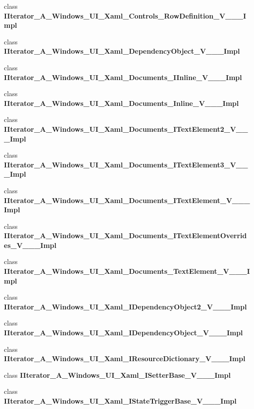 \begin{DoxyCompactItemize}
\item 
class {\bfseries I\+Iterator\+\_\+\+A\+\_\+\+Windows\+\_\+\+U\+I\+\_\+\+Xaml\+\_\+\+Controls\+\_\+\+Row\+Definition\+\_\+\+V\+\_\+\+\_\+\+\_\+\+Impl}
\item 
class {\bfseries I\+Iterator\+\_\+\+A\+\_\+\+Windows\+\_\+\+U\+I\+\_\+\+Xaml\+\_\+\+Dependency\+Object\+\_\+\+V\+\_\+\+\_\+\+\_\+\+Impl}
\item 
class {\bfseries I\+Iterator\+\_\+\+A\+\_\+\+Windows\+\_\+\+U\+I\+\_\+\+Xaml\+\_\+\+Documents\+\_\+\+I\+Inline\+\_\+\+V\+\_\+\+\_\+\+\_\+\+Impl}
\item 
class {\bfseries I\+Iterator\+\_\+\+A\+\_\+\+Windows\+\_\+\+U\+I\+\_\+\+Xaml\+\_\+\+Documents\+\_\+\+Inline\+\_\+\+V\+\_\+\+\_\+\+\_\+\+Impl}
\item 
class {\bfseries I\+Iterator\+\_\+\+A\+\_\+\+Windows\+\_\+\+U\+I\+\_\+\+Xaml\+\_\+\+Documents\+\_\+\+I\+Text\+Element2\+\_\+\+V\+\_\+\+\_\+\+\_\+\+Impl}
\item 
class {\bfseries I\+Iterator\+\_\+\+A\+\_\+\+Windows\+\_\+\+U\+I\+\_\+\+Xaml\+\_\+\+Documents\+\_\+\+I\+Text\+Element3\+\_\+\+V\+\_\+\+\_\+\+\_\+\+Impl}
\item 
class {\bfseries I\+Iterator\+\_\+\+A\+\_\+\+Windows\+\_\+\+U\+I\+\_\+\+Xaml\+\_\+\+Documents\+\_\+\+I\+Text\+Element\+\_\+\+V\+\_\+\+\_\+\+\_\+\+Impl}
\item 
class {\bfseries I\+Iterator\+\_\+\+A\+\_\+\+Windows\+\_\+\+U\+I\+\_\+\+Xaml\+\_\+\+Documents\+\_\+\+I\+Text\+Element\+Overrides\+\_\+\+V\+\_\+\+\_\+\+\_\+\+Impl}
\item 
class {\bfseries I\+Iterator\+\_\+\+A\+\_\+\+Windows\+\_\+\+U\+I\+\_\+\+Xaml\+\_\+\+Documents\+\_\+\+Text\+Element\+\_\+\+V\+\_\+\+\_\+\+\_\+\+Impl}
\item 
class {\bfseries I\+Iterator\+\_\+\+A\+\_\+\+Windows\+\_\+\+U\+I\+\_\+\+Xaml\+\_\+\+I\+Dependency\+Object2\+\_\+\+V\+\_\+\+\_\+\+\_\+\+Impl}
\item 
class {\bfseries I\+Iterator\+\_\+\+A\+\_\+\+Windows\+\_\+\+U\+I\+\_\+\+Xaml\+\_\+\+I\+Dependency\+Object\+\_\+\+V\+\_\+\+\_\+\+\_\+\+Impl}
\item 
class {\bfseries I\+Iterator\+\_\+\+A\+\_\+\+Windows\+\_\+\+U\+I\+\_\+\+Xaml\+\_\+\+I\+Resource\+Dictionary\+\_\+\+V\+\_\+\+\_\+\+\_\+\+Impl}
\item 
class {\bfseries I\+Iterator\+\_\+\+A\+\_\+\+Windows\+\_\+\+U\+I\+\_\+\+Xaml\+\_\+\+I\+Setter\+Base\+\_\+\+V\+\_\+\+\_\+\+\_\+\+Impl}
\item 
class {\bfseries I\+Iterator\+\_\+\+A\+\_\+\+Windows\+\_\+\+U\+I\+\_\+\+Xaml\+\_\+\+I\+State\+Trigger\+Base\+\_\+\+V\+\_\+\+\_\+\+\_\+\+Impl}

\end{DoxyCompactItemize}
